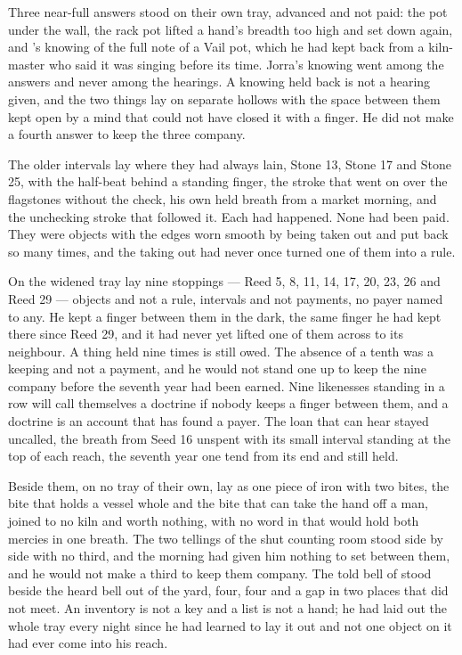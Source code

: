 Three near-full answers stood on their own tray, advanced and not paid: the pot under the wall, the rack pot lifted a hand's breadth too high and set down again, and 's knowing of the full note of a Vail pot, which he had kept back from a kiln-master who said it was singing before its time. Jorra's knowing went among the answers and never among the hearings. A knowing held back is not a hearing given, and the two things lay on separate hollows with the space between them kept open by a mind that could not have closed it with a finger. He did not make a fourth answer to keep the three company.

The older intervals lay where they had always lain, Stone 13, Stone 17 and Stone 25, with the half-beat behind a standing finger, the stroke that went on over the flagstones without the check, his own held breath from a market morning, and the unchecking stroke that followed it. Each had happened. None had been paid. They were objects with the edges worn smooth by being taken out and put back so many times, and the taking out had never once turned one of them into a rule.

On the widened tray lay nine stoppings --- Reed 5, 8, 11, 14, 17, 20, 23, 26 and Reed 29 --- objects and not a rule, intervals and not payments, no payer named to any. He kept a finger between them in the dark, the same finger he had kept there since Reed 29, and it had never yet lifted one of them across to its neighbour. A thing held nine times is still owed. The absence of a tenth was a keeping and not a payment, and he would not stand one up to keep the nine company before the seventh year had been earned. Nine likenesses standing in a row will call themselves a doctrine if nobody keeps a finger between them, and a doctrine is an account that has found a payer. The loan that can hear stayed uncalled, the breath from Seed 16 unspent with its small interval standing at the top of each reach, the seventh year one tend from its end and still held.

Beside them, on no tray of their own, lay  as one piece of iron with two bites, the bite that holds a vessel whole and the bite that can take the hand off a man, joined to no kiln and worth nothing, with no word in  that would hold both mercies in one breath. The two tellings of the shut counting room stood side by side with no third, and the morning had given him nothing to set between them, and he would not make a third to keep them company. The told bell of  stood beside the heard bell out of the yard, four, four and a gap in two places that did not meet. An inventory is not a key and a list is not a hand; he had laid out the whole tray every night since he had learned to lay it out and not one object on it had ever come into his reach.

